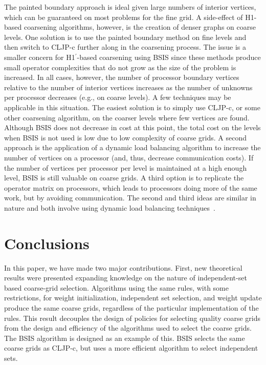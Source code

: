\documentclass{elsart}
\begin{document}
The painted boundary approach is ideal given large numbers of interior
vertices, which can be guaranteed on most problems for the fine grid.
A side-effect of H1-based coarsening algorithms, however, is the
creation of denser graphs on coarse levels. One solution is to use the
painted boundary method on fine levels and then switch to CLJP-c
further along in the coarsening process. The issue is a smaller
concern for H1$^\prime$-based coarsening using BSIS since these
methods produce small operator complexities that do not grow as the
size of the problem is increased. In all cases, however, the number of
processor boundary vertices relative to the number of interior
vertices increases as the number of unknowns per processor decreases
(e.g., on coarse levels). A few techniques may be applicable in this
situation. The easiest solution is to simply use CLJP-c, or some other
coarsening algorithm, on the coarser levels where few vertices are
found. Although BSIS does not decrease in cost at this point, the
total cost on the levels when BSIS is not used is low due to low
complexity of coarse grids. A second approach is the application of a
dynamic load balancing algorithm to increase the number of vertices on
a processor (and, thus, decrease communication costs). If the number
of vertices per processor per level is maintained at a high enough
level, BSIS is still valuable on coarse grids. A third option is to
replicate the operator matrix on processors, which leads to processors
doing more of the same work, but by avoiding communication. The second
and third ideas are similar in nature and both involve using dynamic
load balancing
techniques~\cite{DevineBomanKarypisPP04,CybDLB,deCoughnyLB,SchloegelLB,ZoltanParHyp06ipdps,ZoltanParHypRepart07}.

\section{Conclusions}
\label{sec:conclusions}
In this paper, we have made two major contributions. First, new
theoretical results were presented expanding knowledge on the nature
of independent-set based coarse-grid selection. Algorithms using the
same rules, with some restrictions, for weight initialization,
independent set selection, and weight update produce the same coarse
grids, regardless of the particular implementation of the
rules. This result decouples the design of policies for selecting
quality coarse grids from the design and efficiency of the algorithms
used to select the coarse grids. The BSIS algorithm is designed as an
example of this. BSIS selects the same coarse grids as CLJP-c, but
uses a more efficient algorithm to select independent sets.



\end{document}
